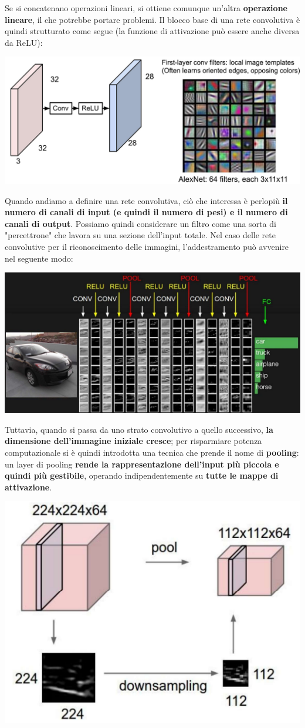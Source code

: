 \documentclass[12pt]{article}
\begin{document}
Se si concatenano operazioni lineari, si ottiene comunque un'altra \textbf{operazione lineare}, il che potrebbe portare problemi.
Il blocco base di una rete convolutiva è quindi strutturato come segue (la funzione di attivazione può essere anche diversa da ReLU):
\begin{center}
    \includegraphics[width =0.80\linewidth]{Images/152.PNG}
\end{center}
Quando andiamo a definire una rete convolutiva, ciò che interessa è perlopiù \textbf{il numero di canali di input (e quindi il numero di pesi) e il numero di canali di output}.
Possiamo quindi considerare un filtro come una sorta di "percettrone" che lavora su una sezione dell'input totale. Nel caso delle rete convolutive per il riconoscimento delle immagini, l'addestramento può avvenire nel seguente modo:
\begin{center}
    \includegraphics[width =0.80\linewidth]{Images/153.PNG}
\end{center}
Tuttavia, quando si passa da uno strato convolutivo a quello successivo, \textbf{la dimensione dell'immagine iniziale cresce}; per risparmiare potenza computazionale si è quindi introdotta una tecnica
che prende il nome di \textbf{pooling}: un layer di pooling \textbf{rende la rappresentazione dell'input più piccola e quindi più gestibile}, operando indipendentemente su \textbf{tutte le mappe di attivazione}.
\begin{center}
    \includegraphics[width =0.50\linewidth]{Images/154.PNG}
\end{center}
\end{document}
